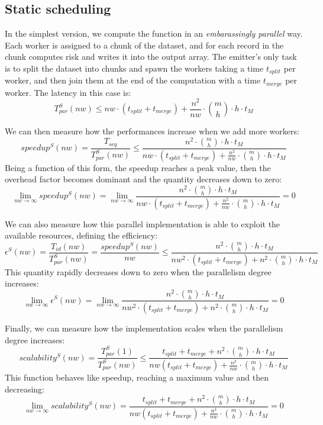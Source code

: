 \documentclass[a4paper]{article}
\begin{document}
\subsection{Static scheduling}

In the simplest version, we compute the function in an \textit{embarassingly parallel} way. Each worker is assigned to a chunk of the dataset, and for each record in the chunk computes risk and writes it into the output array. The emitter's only task is to split the dataset into chunks and spawn the workers taking a time $t_{split}$ per worker, and then join them at the end of the computation with a time $t_{merge}$ per worker. The latency in this case is:
$$
    T_{par}^S(nw) \le nw \cdot \left ( t_{split} + t_{merge} \right ) + \frac{n^2}{nw} \cdot \binom{m}{h} \cdot h \cdot t_M
$$

We can then measure how the performances increase when we add more workers:
$$
    speedup^S(nw) = \frac{T_{seq}}{T_{par}^S(nw)} \le \frac{n^2 \cdot \binom{m}{h} \cdot h \cdot t_M}{nw \cdot \left ( t_{split} + t_{merge} \right ) + \frac{n^2}{nw} \cdot \binom{m}{h} \cdot h \cdot t_M}
$$
Being a function of this form, the speedup reaches a peak value, then the overhead factor becomes dominant and the quantity decreases down to zero:
$$
    \lim \limits_{nw \to \infty} speedup^S(nw) = \lim \limits_{nw \to \infty} \frac{n^2 \cdot \binom{m}{h} \cdot h \cdot t_M}{nw \cdot \left ( t_{split} + t_{merge} \right ) + \frac{n^2}{nw} \cdot \binom{m}{h} \cdot h \cdot t_M} = 0
$$

We can also measure how this parallel implementation is able to exploit the available resources, defining the efficiency:
$$
    \epsilon^S(nw) = \frac{T_{id}(nw)}{T_{par}^S(nw)} = \frac{speedup^S(nw)}{nw} \le \frac{n^2 \cdot \binom{m}{h} \cdot h \cdot t_M}{nw^2 \cdot \left ( t_{split} + t_{merge} \right ) + n^2 \cdot \binom{m}{h} \cdot h \cdot t_M}
$$
This quantity rapidly decreases down to zero when the parallelism degree increases:
$$
    \lim \limits_{nw \to \infty} \epsilon^S(nw) = \lim \limits_{nw \to \infty} \frac{n^2 \cdot \binom{m}{h} \cdot h \cdot t_M}{nw^2 \cdot \left ( t_{split} + t_{merge} \right ) + n^2 \cdot \binom{m}{h} \cdot h \cdot t_M} = 0
$$

Finally, we can measure how the implementation scales when the parallelism degree increases:
$$
    scalability^S(nw) = \frac{T_{par}^S(1)}{T_{par}^S(nw)} \le \frac{t_{split} + t_{merge} + n^2 \cdot \binom{m}{h} \cdot h \cdot t_M}{nw \left (t_{split} + t_{merge} \right ) + \frac{n^2}{nw} \cdot \binom{m}{h} \cdot h \cdot t_M}
$$
This function behaves like speedup, reaching a maximum value and then decreasing:
$$
    \lim \limits_{nw \to \infty} scalability^S(nw) = \frac{t_{split} + t_{merge} + n^2 \cdot \binom{m}{h} \cdot h \cdot t_M}{nw \left (t_{split} + t_{merge} \right ) + \frac{n^2}{nw} \cdot \binom{m}{h} \cdot h \cdot t_M} = 0
$$
\end{document}
